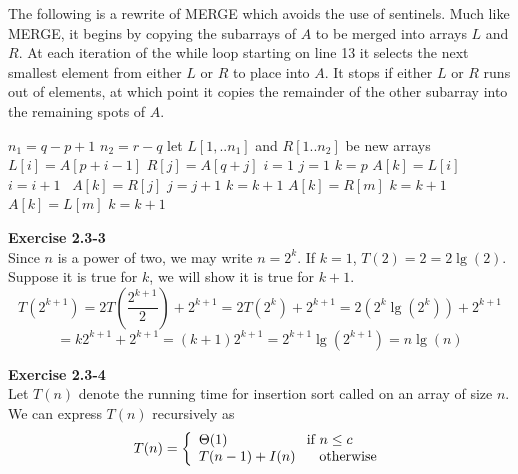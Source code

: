 \documentclass{article}
\begin{document}
The following is a rewrite of MERGE which avoids the use of sentinels.  Much like MERGE, it begins by copying the subarrays of $A$ to be merged into arrays $L$ and $R$.  At each iteration of the while loop starting on line 13 it selects the next smallest element from either $L$ or $R$ to place into $A$.  It stops if either $L$ or $R$ runs out of elements, at which point it copies the remainder of the other subarray into the remaining spots of $A$.  \\

\begin{algorithm}
\caption{$Merge(A,p,q,r)$}
\begin{algorithmic}[1]
\State $n_1 = q-p+1$
\State $n_2 = r-q$
\State let $L[1,..n_1]$ and $R[1..n_2]$ be new arrays
	\State $L[i] = A[p+i-1]$
\EndFor
{}
	\State $R[j] = A[q+j]$
\EndFor
\State $i=1$
\State $j=1$
\State $k=p$
		\State $A[k] = L[i]$
		\State $i = i+1$
	\Else  $\,\,\,A[k] = R[j]$
		\State $j = j+1$
	\EndIf
\State $k = k + 1$
\EndWhile
{}
		\State $A[k] = R[m]$
		\State $k = k + 1$	
	\EndFor
\EndIf
{}
		\State $A[k] = L[m]$
		\State $k = k + 1$
	\EndFor
\EndIf
\end{algorithmic}
\end{algorithm}


\noindent\textbf{Exercise 2.3-3}\\

Since $n$ is a power of two, we may write $n= 2^k$. If $k=1$, $T(2) = 2 = 2\lg(2)$. Suppose it is true for $k$, we will show it is true for $k+1$.
\[
T(2^{k+1}) = 2T\left(\frac{2^{k+1}}{2}\right) + 2^{k+1} = 2T\left(2^{k}\right) + 2^{k+1} = 2(2^k\lg(2^k)) + 2^{k+1} \]\[= k2^{k+1}+ 2^{k+1} = (k+1)2^{k+1} = 2^{k+1} \lg(2^{k+1}) = n\lg(n)
\]

\noindent\textbf{Exercise 2.3-4}\\

Let $T(n)$ denote the running time for insertion sort called on an array of size $n$.  We can express $T(n)$ recursively as 
\[ T(n) = \left\{ \begin{array}{l} \Theta(1) \hspace{2cm} \mbox{if } n \leq c \\ T(n-1) + I(n) \hspace{.6cm} \mbox{otherwise}\end{array} \right. \]
\end{document}
